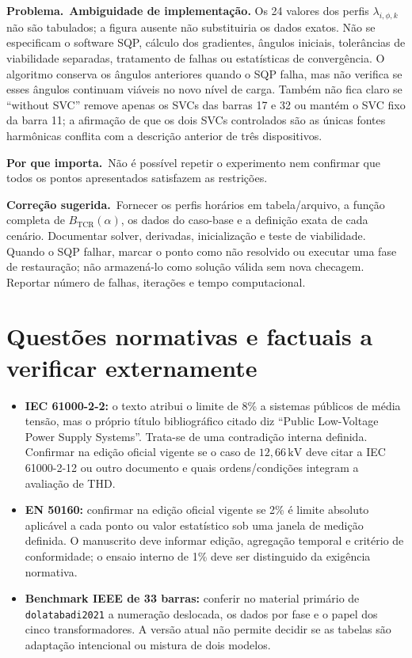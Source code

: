 \documentclass[11pt,a4paper]{article}
\newcommand{\problema}{\textbf{Problema.}\ }
\newcommand{\impacto}{\textbf{Por que importa.}\ }
\newcommand{\correcao}{\textbf{Correção sugerida.}\ }
\begin{document}
\problema \textbf{Ambiguidade de implementação.} Os 24 valores dos perfis
$\lambda_{i,\phi,k}$ não são tabulados; a figura ausente não substituiria os
dados exatos. Não se especificam o software SQP, cálculo dos gradientes,
ângulos iniciais, tolerâncias de viabilidade separadas, tratamento de falhas ou
estatísticas de convergência. O algoritmo conserva os ângulos anteriores quando
o SQP falha, mas não verifica se esses ângulos continuam viáveis no novo nível
de carga. Também não fica claro se ``without SVC'' remove apenas os SVCs das
barras 17 e 32 ou mantém o SVC fixo da barra 11; a afirmação de que os dois SVCs
controlados são as únicas fontes harmônicas conflita com a descrição anterior
de três dispositivos.

\impacto Não é possível repetir o experimento nem confirmar que todos os
pontos apresentados satisfazem as restrições.

\correcao Fornecer os perfis horários em tabela/arquivo, a função completa de
$B_{\mathrm{TCR}}(\alpha)$, os dados do caso-base e a definição exata de cada
cenário. Documentar solver, derivadas, inicialização e teste de viabilidade.
Quando o SQP falhar, marcar o ponto como não resolvido ou executar uma fase de
restauração; não armazená-lo como solução válida sem nova checagem. Reportar
número de falhas, iterações e tempo computacional.

\section*{Questões normativas e factuais a verificar externamente}

\begin{itemize}
  \item \textbf{IEC 61000-2-2:} o texto atribui o limite de 8\% a sistemas
  públicos de média tensão, mas o próprio título bibliográfico citado diz
  ``Public Low-Voltage Power Supply Systems''. Trata-se de uma contradição
  interna definida. Confirmar na edição oficial vigente se o caso de
  $12{,}66\,\mathrm{kV}$ deve citar a IEC 61000-2-12 ou outro documento e quais
  ordens/condições integram a avaliação de THD.
  \item \textbf{EN 50160:} confirmar na edição oficial vigente se 2\% é limite
  absoluto aplicável a cada ponto ou valor estatístico sob uma janela de
  medição definida. O manuscrito deve informar edição, agregação temporal e
  critério de conformidade; o ensaio interno de 1\% deve ser distinguido da
  exigência normativa.
  \item \textbf{Benchmark IEEE de 33 barras:} conferir no material primário de
  \texttt{dolatabadi2021} a numeração deslocada, os dados por fase e o papel dos
  cinco transformadores. A versão atual não permite decidir se as tabelas são
  adaptação intencional ou mistura de dois modelos.
\end{itemize}
\end{document}
